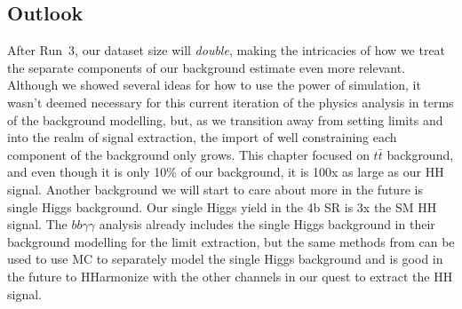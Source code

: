 \subsection{Outlook}
\label{pure-qcd-outlook}
After Run~3, our dataset size will \emph{double}, making the intricacies of how we treat the separate components of our background estimate even more relevant.
Although we showed several ideas for how to use the power of simulation, it wasn't deemed necessary for this current iteration of the physics analysis in terms of the background modelling, but, as we transition away from setting limits and into the realm of signal extraction, the import of well constraining each component of the background only grows.
This chapter focused on $t\bar{t}$ background, and even though it is only 10\% of our background, it is 100x as large as our HH signal. Another background we will start to care about more in the future is single Higgs background. Our single Higgs yield in the 4b SR is 3x the SM HH signal. 
The $bb\gamma \gamma$ analysis already includes the single Higgs background in their background modelling for the limit extraction, but the same methods from \Sect{\ref{pure-qcd-math}} can be used to use MC to separately model the single Higgs background and is good in the future to HHarmonize with the other channels in our quest to extract the HH signal.



